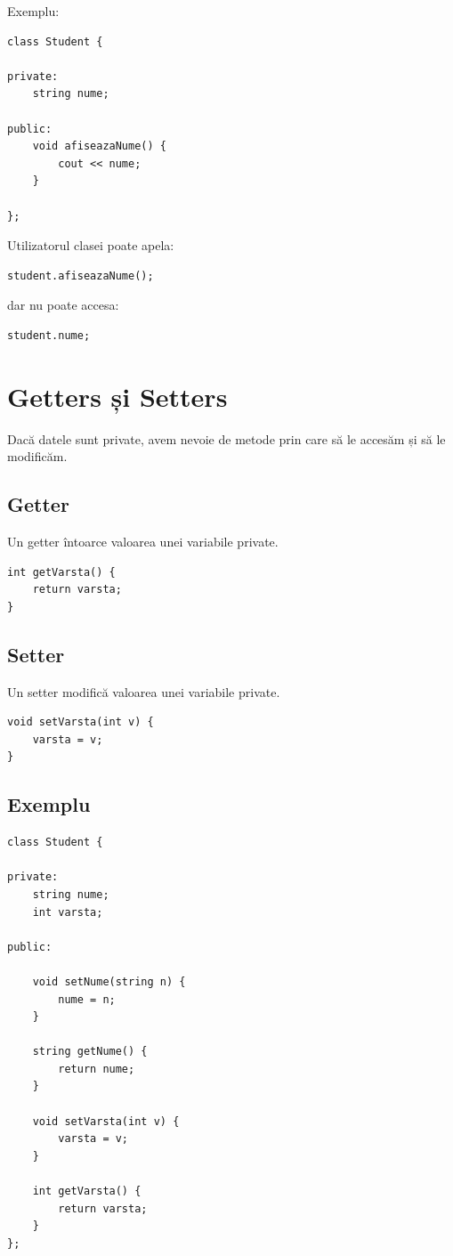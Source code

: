 \documentclass[12pt,a4paper]{article}
\begin{document}
Exemplu:

\begin{lstlisting}
class Student {

private:
    string nume;

public:
    void afiseazaNume() {
        cout << nume;
    }

};
\end{lstlisting}

Utilizatorul clasei poate apela:

\begin{lstlisting}
student.afiseazaNume();
\end{lstlisting}

dar nu poate accesa:

\begin{lstlisting}
student.nume;
\end{lstlisting}

\section{Getters și Setters}

Dacă datele sunt private, avem nevoie de metode prin care să le accesăm și să le modificăm.

\subsection*{Getter}

Un getter întoarce valoarea unei variabile private.

\begin{lstlisting}
int getVarsta() {
    return varsta;
}
\end{lstlisting}

\subsection*{Setter}

Un setter modifică valoarea unei variabile private.

\begin{lstlisting}
void setVarsta(int v) {
    varsta = v;
}
\end{lstlisting}

\subsection*{Exemplu}

\begin{lstlisting}
class Student {

private:
    string nume;
    int varsta;

public:

    void setNume(string n) {
        nume = n;
    }

    string getNume() {
        return nume;
    }

    void setVarsta(int v) {
        varsta = v;
    }

    int getVarsta() {
        return varsta;
    }
};
\end{lstlisting}
\end{document}
